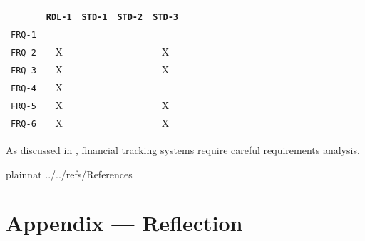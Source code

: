 \documentclass[12pt]{article}
\begin{document}
\begin{enumerate}
\begin{tabular}{|c|c|c|c|c|}
\hline
	& \texttt{RDL-1} & \texttt{STD-1} & \texttt{STD-2} & \texttt{STD-3} \\
\hline
\texttt{FRQ-1} &  &  &  &  \\ \hline
\texttt{FRQ-2} & X &  &  & X \\ \hline
\texttt{FRQ-3} & X &  &  & X \\ \hline
\texttt{FRQ-4} & X &  &  &  \\ \hline
\texttt{FRQ-5} & X &  &  & X \\ \hline
\texttt{FRQ-6} & X &  &  & X \\ \hline
\end{tabular}





\newpage

As discussed in \citet{Ref1}, financial tracking systems require careful requirements analysis.

 {plainnat}
 {../../refs/References}

\newpage

\section*{Appendix --- Reflection}


\end{enumerate}
\end{document}
